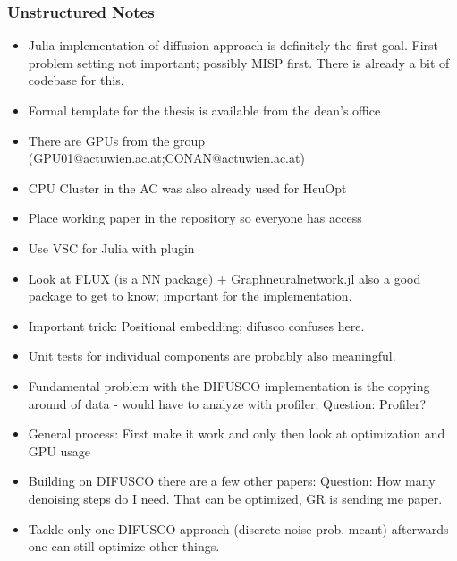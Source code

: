\subsubsection{Unstructured Notes}
\begin{itemize}
    \item Julia implementation of diffusion approach is definitely the first goal. First problem setting not important; possibly MISP first. There is already a bit of codebase for this.
    \item Formal template for the thesis is available from the dean's office
    \item There are GPUs from the group (GPU01@actuwien.ac.at;CONAN@actuwien.ac.at)
    \item CPU Cluster in the AC was also already used for HeuOpt
    \item Place working paper in the repository so everyone has access
    \item Use VSC for Julia with plugin
    \item Look at FLUX (is a NN package) + Graphneuralnetwork.jl also a good package to get to know; important for the implementation.
    \item Important trick: Positional embedding; difusco confuses here.
    \item Unit tests for individual components are probably also meaningful.
    \item Fundamental problem with the DIFUSCO implementation is the copying around of data - would have to analyze with profiler; Question: Profiler?
    \item General process: First make it work and only then look at optimization and GPU usage
    \item Building on DIFUSCO there are a few other papers: Question: How many denoising steps do I need. That can be optimized, GR is sending me paper.
    \item Tackle only one DIFUSCO approach (discrete noise prob. meant) afterwards one can still optimize other things.
\end{itemize}